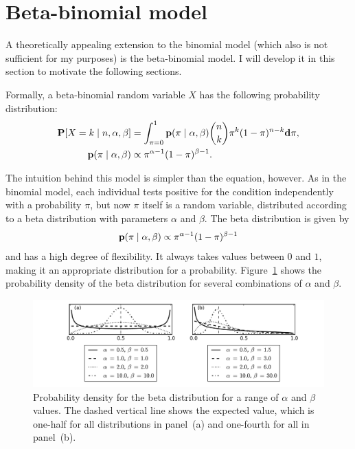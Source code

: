 \section{Beta-binomial model}
\label{beta-binomial-model}
A theoretically appealing extension to the binomial model (which also
is not sufficient for my purposes) is the beta-binomial model.  I will
develop it in this section to motivate the following sections.

Formally, a beta-binomial random variable $X$ has the following
probability distribution:
\begin{align*}
\mathbf{P}[X = k\;|\; n, \alpha, \beta]  &= \int_{\pi=0}^1 \mathbf{p}(\pi\;|\; \alpha, \beta) \binom{n}{k}\pi^k(1-\pi)^{n-k} \mathbf{d}\pi,\\
\mathbf{p}(\pi\;|\; \alpha, \beta) &\propto \pi^{\alpha-1}(1-\pi)^{\beta-1}.
\end{align*}

The intuition behind this model is simpler than the equation,
however. As in the binomial model, each individual tests positive for
the condition independently with a probability $\pi$, but now $\pi$
itself is a random variable, distributed according to a beta
distribution with parameters $\alpha$ and $\beta$. The beta
distribution is given by
\[
\mathbf{p}(\pi\;|\; \alpha, \beta)
\propto \pi^{\alpha-1}(1-\pi)^{\beta-1}
\]
and has a high degree of flexibility.  It always takes values
between $0$ and $1$, making it an appropriate distribution for a
probability.  Figure~\ref{rate-model-beta} shows the probability
density of the beta distribution for several combinations of $\alpha$
and $\beta$.
\begin{figure}[ht]
\begin{center}
\includegraphics[width=\textwidth]{beta-distribution.pdf}
\end{center}
\caption[Probability density for the beta distribution.]{Probability
  density for the beta distribution for a range of
  $\alpha$ and $\beta$ values. The dashed vertical line shows the expected value,
  which is one-half for all distributions in panel~(a) and
  one-fourth for all in panel~(b).}
\label{rate-model-beta}
\end{figure}

